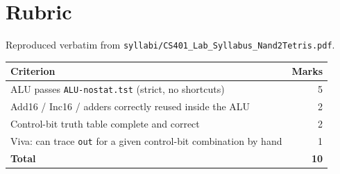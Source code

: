 \documentclass[11pt]{article}
\begin{document}
\section{Rubric}

Reproduced verbatim from \texttt{syllabi/CS401\_Lab\_Syllabus\_Nand2Tetris.pdf}.

\begin{table}[h]
\centering
\begin{tabular}{@{}l r@{}}
\toprule
Criterion & Marks \\
\midrule
ALU passes \texttt{ALU-nostat.tst} (strict, no shortcuts) & 5 \\
Add16 / Inc16 / adders correctly reused inside the ALU & 2 \\
Control-bit truth table complete and correct & 2 \\
Viva: can trace \texttt{out} for a given control-bit combination by hand & 1 \\
\midrule
\textbf{Total} & \textbf{10} \\
\bottomrule
\end{tabular}
\end{table}
\end{document}
